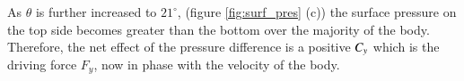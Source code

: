 As $\theta$ is further increased to $21^{\circ}$, (figure \ref{fig:surf_pres} (c)) the surface pressure on the top side becomes greater than the bottom over the majority of the body. Therefore, the net effect of the pressure difference is a positive $C_{y}$ which is the driving force $F_y$, now in phase with the velocity of the body.





  
 
 
 
 
 
 

 
 
 
 
 
 
 
 
 
 
 